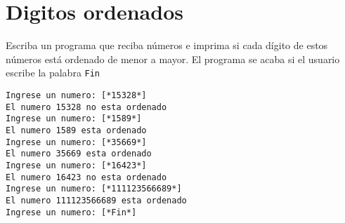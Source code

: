 
\section{Digitos ordenados}

Escriba un programa que reciba números e imprima si cada dígito de estos números está ordenado de menor a mayor. El programa se acaba si el usuario escribe la palabra \texttt{Fin}

\begin{lstlisting}[style=consola]
Ingrese un numero: [*15328*]
El numero 15328 no esta ordenado
Ingrese un numero: [*1589*]
El numero 1589 esta ordenado
Ingrese un numero: [*35669*]
El numero 35669 esta ordenado
Ingrese un numero: [*16423*]
El numero 16423 no esta ordenado
Ingrese un numero: [*111123566689*]
El numero 111123566689 esta ordenado
Ingrese un numero: [*Fin*]
\end{lstlisting}

